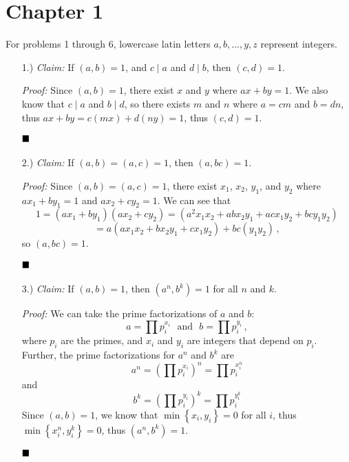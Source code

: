 \documentclass[12pt]{article}
\newcommand{\claim}{\textit{Claim: }}
\newcommand{\proof}{\textit{Proof: }}
\newcommand{\done}{
    \ensuremath{\strut\hfill\blacksquare}
}
\newcommand{\sep}[1]{\ \ \ \text{#1}\ \ \ }
\newcommand{\braces}[1]{\left\{#1\right\}}
\newcommand{\parens}[1]{\left(#1\right)}
\begin{document}

    \pagestyle{fancy}

    \section*{Chapter 1}

    For problems 1 through 6, lowercase latin letters $a,b,\dots,y,z$
    represent integers.
    
    \begin{itemize}
        \item [1.)] \claim If $(a,b)=1$, and $c\mid a$ and $d\mid b$, then
        $(c,d)=1$.
        
        \proof Since $(a,b)=1$, there exist $x$ and $y$ where $ax+by=1$.
        We also know that $c\mid a $ and $b\mid d$, so there exists $m$ and
        $n$ where $a=cm$ and $b=dn$, thus $ax+by=c(mx)+d(ny)=1$, thus
        $(c,d)=1$.
        \done

        \item [2.)] \claim If $(a,b)=(a,c)=1$, then $(a,bc)=1$.

        \proof Since $(a,b)=(a,c)=1$, there exist $x_1$, $x_2$, $y_1$, and
        $y_2$ where $ax_1+by_1=1$ and $ax_2+cy_2=1$.
        We can see that
        \[
            1 = (ax_1+by_1)(ax_2+cy_2)
            = (a^2x_1x_2+abx_2y_1+acx_1y_2+bcy_1y_2)
        \]\[
            = a(ax_1x_2+bx_2y_1+cx_1y_2)+bc(y_1y_2)
            \, ,
        \]
        so $(a,bc)=1$.
        \done

        \item [3.)] \claim If $(a,b) = 1$, then $(a^n,b^k) = 1$ for all $n$ and $k$.
        
        \proof We can take the prime factorizations of $a$ and $b$:
        \[
            a
            = \prod p_i^{x_i}
            \sep{and}
            b
            = \prod p_i^{y_i}
            \, ,
        \]
        where $p_i$ are the primes, and $x_i$ and $y_i$ are integers that
        depend on $p_i$.
        Further, the prime factorizations for $a^n$ and $b^k$ are
        \[
            a^n
            = \parens{\prod p_i^{x_i}}^n
            = \prod p_i^{x_i^n}
        \]
        and
        \[
            b^k
            = \parens{\prod p_i^{y_i}}^k
            = \prod p_i^{y_i^k}
        \]
        Since $(a,b)=1$, we know that $\min \braces{x_i,y_i}=0$ for all $i$,
        thus $\min \braces{x_i^n,y_i^k}=0$, thus $(a^n,b^k)=1$.
        \done


\end{itemize}
\end{document}
